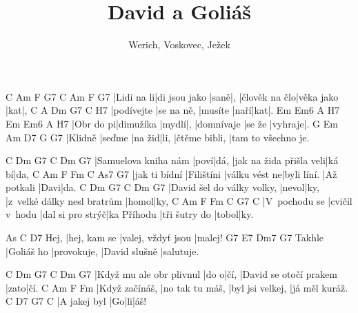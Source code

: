 \documentclass{song}
\title{David a Goliáš}
\author{Werich, Voskovec, Ježek}
\begin{document}
\strophe
C          Am            F    G7  C             Am         F   G7
|Lidi na li|di jsou jako |saně|,  |člověk na člo|věka jako |kat|,
C          A          Dm      G7   C   H7
|podívejte |se na ně, |musíte |naří|kat|.
Em        Em6       A     H7  Em         Em6    A       H7
|Obr do pi|dimužíka |mydlí|,  |domnívaje |se že |vyhraje|.
G       Em     Am     D7   G             G7
|Klidně |seďme |na žid|li, |čtěme bibli, |tam to všechno je.
\endstrophe

\strophe
C                    Dm   G7   C                       Dm    G7
|Samuelova kniha nám |poví|dá, |jak na žida přišla veli|ká bí|da,
C             Am         F             Fm          C           As7  G7
|jak ti bídní |Filištíni |válku vést ne|byli líní. |Až potkali |Davi|da.
C                          Dm    G7   C                           Dm    G7
|David šel do války volky, |nevol|ky, |z~velké dálky nesl bratrům |homol|ky,
C             Am             F                Fm          C             G7   C
|V~pochodu se |cvičil v~hodu |dal si pro strýč|ka Příhodu |tři šutry do |tobol|ky.
\endstrophe

\strophe
     As           C                  D7
Hej, |hej, kam se |valej, vždyť jsou |malej!
       G7         E7          Dm7           G7
Takhle |Goliáš ho |provokuje, |David slušně |salutuje.
\endstrophe

\strophe
C                        Dm   G7   C                      Dm   G7
|Když mu ale obr plivnul |do o|čí, |David se otočí prakem |zato|čí.
C              Am              F                Fm
|Když začínáš, |no tak tu máš, |byl jsi velkej, |já měl kuráž.
C            D7 G7 C
|A jakej byl |Go|li|áš!
\endstrophe

\end{document}

